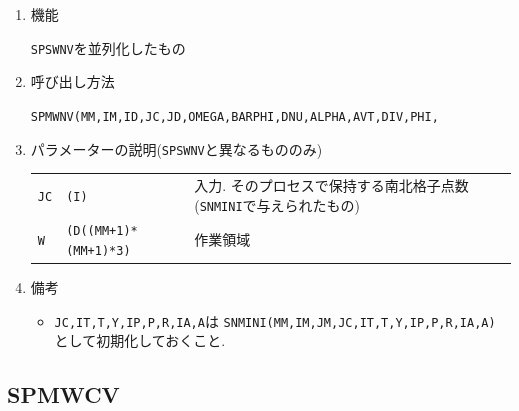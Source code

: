 \begin{enumerate}

\item 機能

{\tt SPSWNV}を並列化したもの

\item 呼び出し方法 

{\tt SPMWNV(MM,IM,ID,JC,JD,OMEGA,BARPHI,DNU,ALPHA,AVT,DIV,PHI,}\\
\hspace*{10em}{\tt DAVT,DDIV,DPHI,RN,IRM,IT,T,Y,IP,P,R,IA,A,Q,WS,WW,W)}
  
\item パラメーターの説明({\tt SPSWNV}と異なるもののみ)

\begin{tabular}{lll}
{\tt JC} & {\tt (I)} & 入力. そのプロセスで保持する南北格子点数
                        ({\tt SNMINI}で与えられたもの)\\
{\tt W}  & {\tt (D((MM+1)*(MM+1)*3)} & 作業領域
\end{tabular}

\item 備考

\begin{itemize}

\item {\tt JC,IT,T,Y,IP,P,R,IA,A}は 
      {\tt SNMINI(MM,IM,JM,JC,IT,T,Y,IP,P,R,IA,A)} として初期化しておくこと.\\

\end{itemize}

\end{enumerate}


\subsection{SPMWCV}


